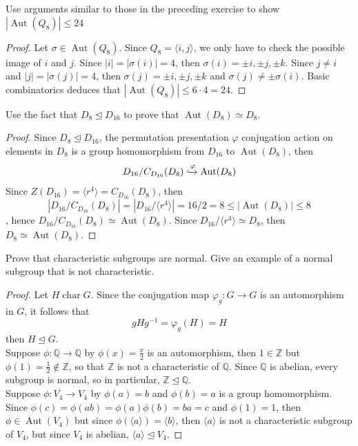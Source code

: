 \documentclass{article}
\newcommand{\Z}{\mathbb{Z}}
\newcommand{\Q}{\mathbb{Q}}
\newenvironment{problem}[2][Problem]{\begin{trivlist}
\item[\hskip \labelsep {\bfseries #1}\hskip \labelsep {\bfseries #2.}]}{\end{trivlist}}
\DeclareMathOperator{\Aut}{Aut}
\DeclareMathOperator{\Char}{char}
\begin{document}
\begin{problem}{4}
    Use arguments similar to those in the preceding exercise to show $|\Aut(Q_8)|\leq 24$
\end{problem}
\begin{proof}
    Let $\sigma \in \Aut(Q_8)$. Since $Q_8 =\langle i, j \rangle$, we only have to check the possible image of $i$ and $j$. Since $|i|=|\sigma(i)|=4$, then $\sigma(i)=\pm i,\pm j, \pm k$. Since $j\neq i$ and $|j|=|\sigma(j)|=4$, then $\sigma(j)=\pm i, \pm j, \pm k$ and $\sigma (j)\neq \pm \sigma(i)$. Basic combinatorics deduces that $|\Aut(Q_8)|\leq 6 \cdot 4=24$. 
\end{proof}
\begin{problem}{5}
    Use the fact that $D_8 \trianglelefteq D_{16}$ to prove that $\Aut(D_8)\simeq D_8$.
\end{problem}
\begin{proof}
    Since $D_8\trianglelefteq D_{16}$, the permutation presentation $\varphi$ conjugation action on elements in $D_8$ is a group homomorphism from $D_{16}$ to $\Aut(D_8)$, then 
    \[
        D_{16}/C_{D_{16}}(D_8) \xhookrightarrow{\varphi} \Aut(D_8)
    \]
    Since $Z(D_{16})= \langle r^4 \rangle = C_{D_{16}}(D_8)$, then 
    \[
    |D_{16}/C_{D_{16}}(D_8)|=|D_{16}/\langle r^4 \rangle| = 16/2=8\leq |\Aut(D_{8})|\leq 8
    \]
    , hence $D_{16}/C_{D_{16}}(D_8) \simeq \Aut(D_8)$. Since $D_{16}/\langle r^4 \rangle \simeq D_8$, then $D_8 \simeq \Aut(D_8)$.
\end{proof}
\begin{problem}{6}
    Prove that characteristic subgroups are normal. Give an example of a normal subgroup that is not characteristic.
\end{problem}
\begin{proof}
    Let $H \Char G$. Since the conjugation map $\varphi_g: G \rightarrow G$ is an automorphism in $G$, it follows that 
    \[
        g H g^{-1} = \varphi_g(H) =H
    \]
    then $H \trianglelefteq G$.\\
    Suppose $\phi : \Q \rightarrow \Q$ by $\phi(x)=\frac{x}{2}$ is an automorphism, then $1 \in \Z $ but $\phi(1)=\frac{1}{2} \notin \Z$, so that $\Z$ is not a characteristic of $\Q$. Since $\Q$ is abelian, every subgroup is normal, so in particular, $\Z \trianglelefteq \Q$.\\
    Suppose $\phi: V_4 \rightarrow V_4$ by $\phi(a)=b$ and $\phi(b)=a$ is a group homomorphism. Since $\phi(c)=\phi(ab)=\phi(a)\phi(b)=ba=c$ and $\phi(1)=1$, then $\phi \in \Aut(V_4)$ but since $\phi(\langle a \rangle) = \langle b \rangle$, then $\langle a \rangle$ is not a characteristic subgroup of $V_4$, but since $V_4$ is abelian, $\langle a \rangle \trianglelefteq V_4$.
\end{proof}
\end{document}

